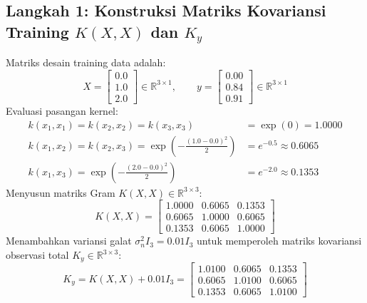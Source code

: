 \documentclass[11pt,a4paper]{article}
\def\mathbf#1{#1}%
\begin{document}
\subsection{Langkah 1: Konstruksi Matriks Kovariansi Training \texorpdfstring{$K(X, X)$ dan $K_y$}{K(X, X) dan Ky}}
Matriks desain training data adalah:
\begin{equation}
X = \begin{bmatrix} 0.0 \\ 1.0 \\ 2.0 \end{bmatrix} \in \mathbb{R}^{3 \times 1}, \qquad \mathbf{y} = \begin{bmatrix} 0.00 \\ 0.84 \\ 0.91 \end{bmatrix} \in \mathbb{R}^{3 \times 1}
\end{equation}
Evaluasi pasangan kernel:
\begin{align*}
k(x_1, x_1) = k(x_2, x_2) = k(x_3, x_3) &= \exp(0) = 1.0000 \\
k(x_1, x_2) = k(x_2, x_3) = \exp\left(-\frac{(1.0 - 0.0)^2}{2}\right) &= e^{-0.5} \approx 0.6065 \\
k(x_1, x_3) = \exp\left(-\frac{(2.0 - 0.0)^2}{2}\right) &= e^{-2.0} \approx 0.1353
\end{align*}
Menyusun matriks Gram $K(X, X) \in \mathbb{R}^{3 \times 3}$:
\begin{equation}
K(X, X) = \begin{bmatrix}
1.0000 & 0.6065 & 0.1353 \\
0.6065 & 1.0000 & 0.6065 \\
0.1353 & 0.6065 & 1.0000
\end{bmatrix}
\end{equation}
Menambahkan variansi galat $\sigma_n^2 I_3 = 0.01 I_3$ untuk memperoleh matriks kovariansi observasi total $K_y \in \mathbb{R}^{3 \times 3}$:
\begin{equation}
K_y = K(X, X) + 0.01 I_3 = \begin{bmatrix}
1.0100 & 0.6065 & 0.1353 \\
0.6065 & 1.0100 & 0.6065 \\
0.1353 & 0.6065 & 1.0100
\end{bmatrix}
\end{equation}
\end{document}
